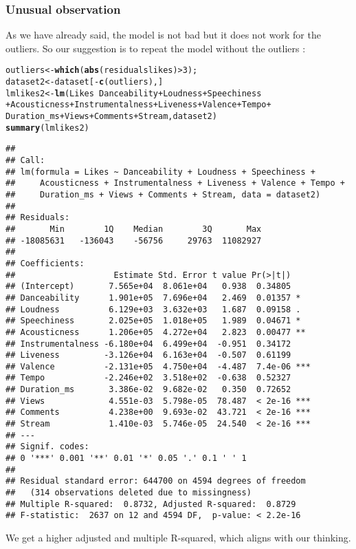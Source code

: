 \documentclass[11pt]{article}\usepackage[]{graphicx}\usepackage[]{xcolor}
\makeatletter
\newcommand{\hlnum}[1]{\textcolor[rgb]{0.686,0.059,0.569}{#1}}%
\newcommand{\hlopt}[1]{\textcolor[rgb]{0,0,0}{#1}}%
\newcommand{\hldef}[1]{\textcolor[rgb]{0.345,0.345,0.345}{#1}}%
\newcommand{\hlkwb}[1]{\textcolor[rgb]{0.69,0.353,0.396}{#1}}%
\newcommand{\hlkwd}[1]{\textcolor[rgb]{0.737,0.353,0.396}{\textbf{#1}}}%
\newenvironment{kframe}{%
 \def\at@end@of@kframe{}%
 \ifinner\ifhmode%
  \def\at@end@of@kframe{\end{minipage}}%
  \begin{minipage}{\columnwidth}%
 \fi\fi%
 \def\FrameCommand##1{\hskip\@totalleftmargin \hskip-\fboxsep
 \colorbox{shadecolor}{##1}\hskip-\fboxsep
     \hskip-\linewidth \hskip-\@totalleftmargin \hskip\columnwidth}%
 \MakeFramed {\advance\hsize-\width
   \@totalleftmargin\z@ \linewidth\hsize
   \@setminipage}}%
 {\par\unskip\endMakeFramed%
 \at@end@of@kframe}
\newenvironment{knitrout}{}{} %
\makeatother
\begin{document}
\subsubsection{Unusual observation}
As we have already said, the model is not bad but it does not work for the outliers. So our suggestion is to repeat the model without the outliers :
\begin{knitrout}
\color{fgcolor}\begin{kframe}
\begin{alltt}
\hldef{outliers}\hlkwb{<-}\hlkwd{which}\hldef{(}\hlkwd{abs}\hldef{(residualslikes)} \hlopt{>} \hlnum{3}\hldef{);}
\hldef{dataset2} \hlkwb{<-} \hldef{dataset[}\hlopt{-}\hlkwd{c}\hldef{(outliers), ]}
\hldef{lmlikes2} \hlkwb{<-} \hlkwd{lm}\hldef{(Likes}\hlopt{~}\hldef{Danceability}\hlopt{+}\hldef{Loudness}\hlopt{+} \hldef{Speechiness}
               \hlopt{+}\hldef{Acousticness}\hlopt{+}\hldef{Instrumentalness}\hlopt{+}\hldef{Liveness}\hlopt{+}\hldef{Valence}\hlopt{+}\hldef{Tempo}\hlopt{+}
                 \hldef{Duration_ms} \hlopt{+} \hldef{Views}\hlopt{+}\hldef{Comments}\hlopt{+}\hldef{Stream, dataset2)}
\hlkwd{summary}\hldef{(lmlikes2)}
\end{alltt}
\begin{verbatim}
## 
## Call:
## lm(formula = Likes ~ Danceability + Loudness + Speechiness + 
##     Acousticness + Instrumentalness + Liveness + Valence + Tempo + 
##     Duration_ms + Views + Comments + Stream, data = dataset2)
## 
## Residuals:
##       Min        1Q    Median        3Q       Max 
## -18085631   -136043    -56756     29763  11082927 
## 
## Coefficients:
##                    Estimate Std. Error t value Pr(>|t|)    
## (Intercept)       7.565e+04  8.061e+04   0.938  0.34805    
## Danceability      1.901e+05  7.696e+04   2.469  0.01357 *  
## Loudness          6.129e+03  3.632e+03   1.687  0.09158 .  
## Speechiness       2.025e+05  1.018e+05   1.989  0.04671 *  
## Acousticness      1.206e+05  4.272e+04   2.823  0.00477 ** 
## Instrumentalness -6.180e+04  6.499e+04  -0.951  0.34172    
## Liveness         -3.126e+04  6.163e+04  -0.507  0.61199    
## Valence          -2.131e+05  4.750e+04  -4.487  7.4e-06 ***
## Tempo            -2.246e+02  3.518e+02  -0.638  0.52327    
## Duration_ms       3.386e-02  9.682e-02   0.350  0.72652    
## Views             4.551e-03  5.798e-05  78.487  < 2e-16 ***
## Comments          4.238e+00  9.693e-02  43.721  < 2e-16 ***
## Stream            1.410e-03  5.746e-05  24.540  < 2e-16 ***
## ---
## Signif. codes:  
## 0 '***' 0.001 '**' 0.01 '*' 0.05 '.' 0.1 ' ' 1
## 
## Residual standard error: 644700 on 4594 degrees of freedom
##   (314 observations deleted due to missingness)
## Multiple R-squared:  0.8732,	Adjusted R-squared:  0.8729 
## F-statistic:  2637 on 12 and 4594 DF,  p-value: < 2.2e-16
\end{verbatim}
\end{kframe}
\end{knitrout}
We get a higher adjusted and multiple R-squared, which aligns with our thinking.
\end{document}
